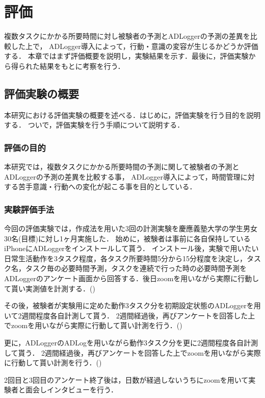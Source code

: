 \chapter{評価}
複数タスクにかかる所要時間に対し被験者の予測とADLoggerの予測の差異を比較した上で，
ADLogger導入によって，行動・意識の変容が生じるかどうか評価する．
本章ではまず評価概要を説明し，実験結果を示す．最後に，評価実験から得られた結果をもとに考察を行う．

\section{評価実験の概要}
本研究における評価実験の概要を述べる．はじめに，評価実験を行う目的を説明する．
ついで，評価実験を行う手順について説明する．

\subsection{評価の目的}
本研究では，複数タスクにかかる所要時間の予測に関して被験者の予測とADLoggerの予測の差異を比較する事，
ADLogger導入によって，時間管理に対する苦手意識・行動への変化が起こる事を目的としている．

\subsection{実験評価手法}
今回の評価実験では，作成法\cite{Oguro1961}\cite{Tayama2018}を用いた3回の計測実験を慶應義塾大学の学生男女30名(目標)に対し1ヶ月実施した．
始めに，被験者は事前に各自保持しているiPhoneにADLoggerをインストールして貰う．
インストール後，実験で用いたい日常生活動作を3タスク程度，各タスク所要時間5分から15分程度を決定し，タスク名，タスク毎の必要時間予測，タスクを連続で行った時の必要時間予測をADLoggerのアンケート画面から回答する．後日zoom\cite{zoom}を用いながら実際に行動して貰い実測値を計測する．()

その後，被験者が実験用に定めた動作3タスク分を初期設定状態のADLoggerを用いて2週間程度各自計測して貰う．
2週間経過後，再びアンケートを回答した上でzoom\cite{zoom}を用いながら実際に行動して貰い計測を行う．()

更に，ADLoggerのADLogを用いながら動作3タスク分を更に2週間程度各自計測して貰う．
2週間経過後，再びアンケートを回答した上でzoom\cite{zoom}を用いながら実際に行動して貰い計測を行う．()

2回目と3回目のアンケート終了後は，日数が経過しないうちにzoom\cite{zoom}を用いて実験者と面会しインタビューを行う．

